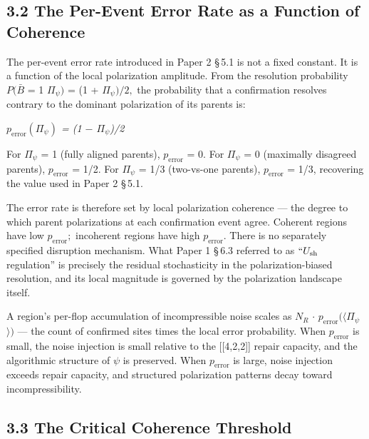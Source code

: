 \documentclass[11pt,oneside]{report}
\theoremstyle{definition}
\theoremstyle{remark}
\begin{document}
\subsection*{3.2 The Per-Event Error Rate as a Function of Coherence}

The per-event error rate introduced in Paper 2 \S\,5.1 is not a fixed
constant. It is a function of the local polarization amplitude. From the
resolution probability \ensuremath{P(\bar{B}} = 1 \textbar{} \ensuremath{\Pi_{\psi})} = (1 + \ensuremath{\Pi_{\psi})/2,} the
probability that a confirmation resolves contrary to the dominant
polarization of its parents is:

\emph{\ensuremath{p_{\mathrm{error}}(\Pi_{\psi})} = (1 \ensuremath{-} \textbar \ensuremath{\Pi_{\psi}}\textbar)/2}

For \textbar \ensuremath{\Pi_{\psi}}\textbar{} = 1 (fully aligned parents), \ensuremath{p_{\mathrm{error}}} = 0.
For \textbar \ensuremath{\Pi_{\psi}}\textbar{} = 0 (maximally disagreed parents), \ensuremath{p_{\mathrm{error}}}
= 1/2. For \textbar \ensuremath{\Pi_{\psi}}\textbar{} = 1/3 (two-vs-one parents), \ensuremath{p_{\mathrm{error}}}
= 1/3, recovering the value used in Paper 2 \S\,5.1.

The error rate is therefore set by local polarization coherence --- the
degree to which parent polarizations at each confirmation event agree.
Coherent regions have low \ensuremath{p_{\mathrm{error}};} incoherent regions have high
\ensuremath{p_{\mathrm{error}}.} There is no separately specified disruption mechanism. What
Paper 1 \S\,6.3 referred to as \ensuremath{``U_{\mathrm{sh}}} regulation'' is precisely the residual
stochasticity in the polarization-biased resolution, and its local
magnitude is governed by the polarization landscape itself.

A region's per-flop accumulation of incompressible noise scales as \ensuremath{N_{R}}
\ensuremath{\cdot} \ensuremath{p_{\mathrm{error}}(\langle}\textbar \ensuremath{\Pi_{\psi}}\textbar\ensuremath{\rangle )} --- the count of confirmed sites
times the local error probability. When \ensuremath{p_{\mathrm{error}}} is small, the noise
injection is small relative to the [[4,2,2]] repair capacity,
and the algorithmic structure of \ensuremath{\psi} is preserved. When \ensuremath{p_{\mathrm{error}}} is large,
noise injection exceeds repair capacity, and structured polarization
patterns decay toward incompressibility.

\subsection*{3.3 The Critical Coherence Threshold}
\end{document}
